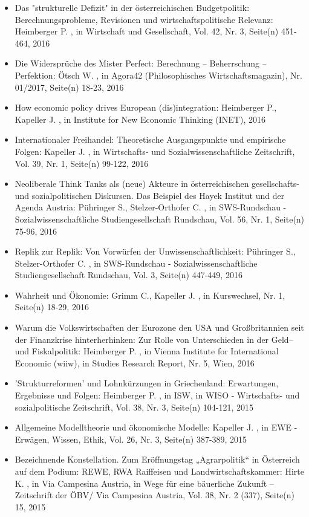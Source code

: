 \begin{itemize}
\item Das "strukturelle Defizit" in der österreichischen Budgetpolitik: Berechnungsprobleme, Revisionen und wirtschaftspolitische Relevanz: Heimberger P. , in Wirtschaft und Gesellschaft, Vol. 42, Nr. 3, Seite(n) 451-464, 2016
\item Die Widersprüche des Mister Perfect: Berechnung – Beherrschung – Perfektion: Ötsch W. , in Agora42 (Philosophisches Wirtschaftsmagazin), Nr. 01/2017, Seite(n) 18-23, 2016
\item How economic policy drives European (dis)integration: Heimberger P., Kapeller J. , in Institute for New Economic Thinking (INET), 2016
\item Internationaler Freihandel: Theoretische Ausgangspunkte und empirische Folgen: Kapeller J. , in Wirtschafts- und Sozialwissenschaftliche Zeitschrift, Vol. 39, Nr. 1, Seite(n) 99-122, 2016
\item Neoliberale Think Tanks als (neue) Akteure in österreichischen gesellschafts- und sozialpolitischen Diskursen. Das Beispiel des Hayek Institut und der Agenda Austria: Pühringer S., Stelzer-Orthofer C. , in SWS-Rundschau - Sozialwissenschaftliche Studiengesellschaft Rundschau, Vol. 56, Nr. 1, Seite(n) 75-96, 2016
\item Replik zur Replik: Von Vorwürfen der Unwissenschaftlichkeit: Pühringer S., Stelzer-Orthofer C. , in SWS-Rundschau - Sozialwissenschaftliche Studiengesellschaft Rundschau, Vol. 3, Seite(n) 447-449, 2016
\item Wahrheit und Ökonomie: Grimm C., Kapeller J. , in Kurswechsel, Nr. 1, Seite(n) 18-29, 2016
\item Warum die Volkswirtschaften der Eurozone den USA und Großbritannien seit der Finanzkrise hinterherhinken: Zur Rolle von Unterschieden in der Geld– und Fiskalpolitik: Heimberger P. , in Vienna Institute for International Economic (wiiw), in Studies Research Report, Nr. 5, Wien, 2016
\item 'Strukturreformen' und Lohnkürzungen in Griechenland: Erwartungen, Ergebnisse und Folgen: Heimberger P. , in ISW, in WISO - Wirtschafts- und sozialpolitische Zeitschrift, Vol. 38, Nr. 3, Seite(n) 104-121, 2015
\item Allgemeine Modelltheorie und ökonomische Modelle: Kapeller J. , in EWE - Erwägen, Wissen, Ethik, Vol. 26, Nr. 3, Seite(n) 387-389, 2015
\item Bezeichnende Konstellation. Zum Eröffnungstag „Agrarpolitik“ in Österreich auf dem Podium: REWE, RWA Raiffeisen und Landwirtschaftskammer: Hirte K. , in Via Campesina Austria, in Wege für eine bäuerliche Zukunft – Zeitschrift der ÖBV/ Via Campesina Austria, Vol. 38, Nr. 2 (337), Seite(n) 15, 2015

\end{itemize}
